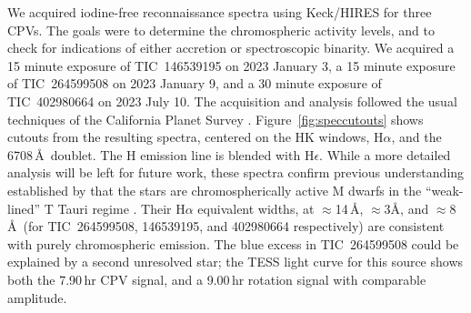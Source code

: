 \documentclass[11pt,twocolumn,tighten]{aastex63}
\begin{document}
We acquired iodine-free reconnaissance spectra using Keck/HIRES for
three CPVs.  The goals were to determine the chromospheric activity
levels, and to check for indications of either accretion or
spectroscopic binarity.  We acquired a 15 minute exposure of
TIC~146539195 on 2023 January 3, a 15 minute exposure of TIC~264599508
on 2023 January 9, and a 30 minute exposure of TIC~402980664 on 2023
July 10.  The acquisition and analysis followed the usual techniques
of the California Planet Survey \citep{2010ApJ...721.1467H}.
Figure~\ref{fig:speccutouts} shows cutouts from the resulting spectra,
centered on the  HK windows, H$\alpha$, and the 
6708\,\AA\ doublet.  The  H emission line is blended with
H$\epsilon$.  While a more detailed analysis will be left for future
work, these spectra confirm previous understanding established by
\citet{2017AJ....153..152S} that the stars are chromospherically
active M dwarfs in the ``weak-lined'' T Tauri regime
\citep[e.g.][Figure~15]{2019AJ....157...85B}.  Their H$\alpha$
equivalent widths, at $\approx$14\,\AA, $\approx$3\AA, and
$\approx$8\,\AA\ (for TIC~264599508, 146539195, and 402980664
respectively) are consistent with purely chromospheric emission.  The
blue excess in TIC~264599508 could be explained by a second unresolved
star; the TESS light curve for this source shows both the 7.90\,hr CPV
signal, and a 9.00\,hr rotation signal with comparable amplitude.

\begin{figure*}[!t]
	\begin{center}

	\vspace{-1.cm}

	\vspace{-1.cm}
	\end{center}
	\vspace{-0.4cm}
	\caption{
		{\bf Spectral age and activity diagnostics for three CPVs}.
		Wavelengths are in air;
		the continuum normalization is relative to the entire order.
		The H$\alpha$ emission strength classifies the stars as weak-lined
		T Tauris.
		The lithium detection for TIC~146539195 is consistent with its
		mass and $\beta$~Pic membership;
		the non-detections for TIC~402980664 and TIC~264599508
		are consistent with the $\approx$42\,Myr age implied by their membership
		in the Columba moving group.
	}
	\label{fig:speccutouts}
\end{figure*}
\end{document}
